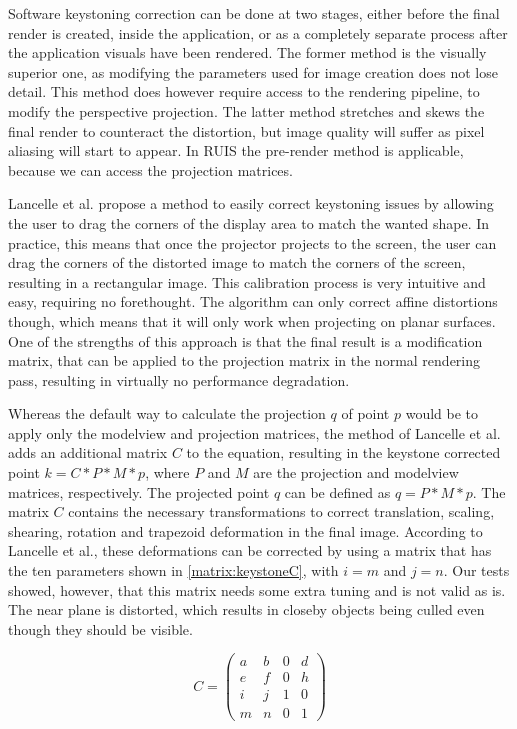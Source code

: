 \documentclass[12pt,a4paper,oneside,pdftex]{report}
\begin{document}
Software keystoning correction can be done at two stages, either before the final render is created, inside the application, or as a completely separate process after the application visuals have been rendered. The former method is the visually superior one, as modifying the parameters used for image creation does not lose detail. This method does however require access to the rendering pipeline, to modify the perspective projection. The latter method stretches and skews the final render to counteract the distortion, but image quality will suffer as pixel aliasing will start to appear. In RUIS the pre-render method is applicable, because we can access the projection matrices.

Lancelle et al. \cite{TUGrazKeystoning} propose a method to easily correct keystoning issues by allowing the user to drag the corners of the display area to match the wanted shape. In practice, this means that once the projector projects to the screen, the user can drag the corners of the distorted image to match the corners of the screen, resulting in a rectangular image. This calibration process is very intuitive and easy, requiring no forethought. The algorithm can only correct affine distortions though, which means that it will only work when projecting on planar surfaces. One of the strengths of this approach is that the final result is a modification matrix, that can be applied to the projection matrix in the normal rendering pass, resulting in virtually no performance degradation.

Whereas the default way to calculate the projection $q$ of point $p$ would be to apply only the modelview and projection matrices, the method of Lancelle et al. adds an additional matrix $C$ to the equation, resulting in the keystone corrected point $k = C * P * M * p$, where $P$ and $M$ are the projection and modelview matrices, respectively. The projected point $q$ can be defined as $q = P * M * p$. The matrix $C$ contains the necessary transformations to correct translation, scaling, shearing, rotation and trapezoid deformation in the final image. According to Lancelle et al., these deformations can be corrected by using a matrix that has the ten parameters shown in \eqref{matrix:keystoneC}, with $i = m$ and $j = n$. Our tests showed, however, that this matrix needs some extra tuning and is not valid as is. The near plane is distorted, which results in closeby objects being culled even though they should be visible.

\begin{equation}
\label{matrix:keystoneC}
C = \begin{pmatrix}
  a & b & 0 & d \\[0.3em]
  e & f & 0 & h \\[0.3em]
  i & j & 1 & 0 \\[0.3em]
  m & n & 0 & 1
 \end{pmatrix}
 \end{equation}
\end{document}
